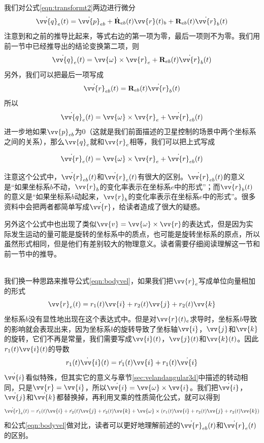 \documentclass[11pt]{article}
\begin{document}
我们对公式\ref{eqn:transformt2}两边进行微分
\begin{equation*}
\dot{\vv{q}}_{e}(t) = \dot{ \vv{p}}_{eb} + \dot{{\bf R}}_{eb}(t)\vv{r}(t)_b +{\bf R}_{eb}(t)  \dot{\vv{r}}_b(t)
\end{equation*}
注意到和之前的推导比起来，等式右边的第一项为零，最后一项则不为零。我们用前一节中已经推导出的结论变换第二项，则
\begin{equation*}
\dot{\vv{q}}_{e}(t) = \vv{\omega} \times \vv{r}_e +{\bf R}_{eb}(t)  \dot{\vv{r}}_b(t)
\end{equation*}
另外，我们可以把最后一项写成
$$
\dot{\vv{r}}_{eb}(t) = {\bf R}_{eb}(t)  \dot{\vv{r}}_b(t)
$$
所以
$$
\dot{\vv{q}}_{e}(t) = \vv{\omega} \times \vv{r}_e + \dot{\vv{r}}_{eb}(t)
$$
进一步地如果$\vv{p}_{eb}$为0（这就是我们前面描述的卫星控制的场景中两个坐标系之间的关系），那么$\vv{q}_e$就和$\vv{r}_e$相等，我们可以把上式写成

\begin{equation}\label{eqn:bodyvel}
\dot{\vv{r}}_{e}(t) = \vv{\omega} \times \vv{r}_e + \dot{\vv{r}}_{eb}(t)
\end{equation}

注意这个公式中，$\dot{\vv{r}}_{eb}(t)$和$\dot{\vv{r}}_{e}(t)$有很大的区别。$\dot{\vv{r}}_{eb}(t)$的意义是“如果坐标系$b$不动，$\vv{r}_b$的变化率表示在坐标系$e$中的形式”；而$\dot{\vv{r}}_{b}(t)$的意义是“如果坐标系$b$动起来，$\vv{r}_b$的变化率表示在坐标系$e$中的形式”。很多资料中会把两者都简单写成$\dot{\vv{r}}$，给读者造成了很大的疑惑。

另外这个公式中也出现了类似$\vv{v} = \vv{\omega} \times \vv{r}$的表达式，但是因为实际发生运动的量可能是旋转的坐标系中的质点，也可能是旋转坐标系的原点，所以虽然形式相同，但是他们有差别较大的物理意义。读者需要仔细阅读理解这一节和前一节中的推导。

\ \\

我们换一种思路来推导公式\ref{eqn:bodyvel}，如果我们把$\vv{r}_e$写成单位向量相加的形式
$$
\vv{r}_e(t) = r_1(t)\vv{i}+r_2(t)\vv{j}+r_2(t)\vv{k}
$$
坐标系$b$没有显性地出现在这个表达式中。但是对$\vv{r}(t)_e$求导时，坐标系$b$导致的影响就会表现出来，因为坐标系$b$的旋转导致了坐标轴$\vv{i}$，$\vv{j}$和$\vv{k}$的旋转，它们不再是常量，我们需要写成$\vv{i}(t)$，$\vv{j}(t)$和$\vv{k}(t)$。因此$r_1(t)\vv{i}(t)$的导数
$$
\dot{r_1(t)\vv{i}(t)} = \dot{r_1}(t)\vv{i} + r_1(t)\dot{\vv{i}}
$$
$\dot{\vv{i}}$看似特殊，但其实它的意义与章节\ref{sec:velandangular3d}中描述的转动相同，只是$\vv{r} = \vv{i}$，所以$\dot{\vv{i}} = \vv{\omega} \times \vv{i}$。我们把$\dot{\vv{i}}$，$\dot{\vv{j}}$和$\dot{\vv{k}}$都替换掉，再利用叉乘的性质简化公式，就可以得到
$$
\dot{\vv{r}}_e(t) = \dot{r_1}(t)\vv{i}+\dot{r_2}(t)\vv{j}+\dot{r_2}(t)\vv{k} + \vv{\omega} \times (r_1(t)\vv{i}+r_2(t)\vv{j}+r_2(t)\vv{k}) 
$$
和公式\ref{eqn:bodyvel}做对比，读者可以更好地理解前述的$\dot{\vv{r}}_{eb}(t)$和$\dot{\vv{r}}_{e}(t)$的区别。
\end{document}
